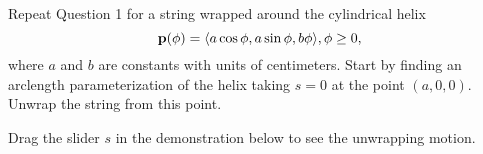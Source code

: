 \documentclass{ximera}
\begin{document}
\begin{question}  \label{Qgtu5uhgfdg}
Repeat Question 1 for a string wrapped around the cylindrical helix
\[
   {\bf p}(\phi) = \langle a \cos \phi, a \sin \phi, b \phi  \rangle , \phi \geq 0 ,
\]
where $a$ and $b$ are constants with units of centimeters. Start by finding an arclength parameterization of the helix taking $s=0$ at the point $(a,0,0)$. Unwrap the string from this point.  

Drag the slider $s$ in the demonstration below to see the unwrapping motion. 

 
\begin{onlineOnly}
    \begin{center}
\end{center}
\end{onlineOnly}

\end{question}
\end{document}

